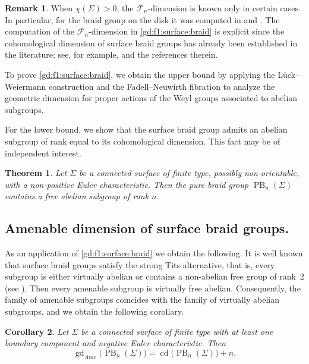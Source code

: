 \documentclass[a4paper,12pt,leqno]{amsart}
\newtheorem{theorem}{Theorem}[section]
\newtheorem{corollary}[theorem]{Corollary}
\theoremstyle{definition}
\newtheorem{remark}{Remark}
\DeclareMathOperator{\cd}{cd}
\newcommand{\ame}{Ame}
\DeclareMathOperator{\gd}{gd}
\DeclareMathOperator{\pb}{PB}
\begin{document}
\begin{remark}
When \(\chi(\Sigma)>0\), the \(\mathcal{F}_n\)-dimension is known only in certain cases. In particular, for the braid group on the disk it was computed in \cite{Ramon:Juan} and \cite[Theorem~1.3]{PL}. The computation of the \(\mathcal{F}_n\)-dimension in \cref{gd:f1:surface:braid} is explicit since the cohomological dimension of surface braid groups has already been established in the literature; see, for example, \cite[Theorem~1.1]{2025arXiv250610706L} and the references therein. %
\end{remark}

To prove \cref{gd:f1:surface:braid}, we obtain the upper bound by applying the Lück--Weiermann construction and the  Fadell--Neuwirth fibration to analyze the geometric dimension for proper actions of the Weyl groups associated to abelian subgroups.

For the lower bound, we show that the surface braid group admits an abelian subgroup of rank equal to its cohomological dimension. This fact may be of independent interest.

\begin{theorem}\label{free:abelian:subgroup:cd:0}
Let \( \Sigma \) be a connected surface of finite type, possibly non-orientable, with a non-positive Euler characteristic. Then the pure braid group $\pb_n(\Sigma)$ contains a free abelian subgroup of rank $n$.
\end{theorem}

\subsection*{Amenable dimension of surface braid groups.} 

As an application of \cref{gd:f1:surface:braid} we obtain the following. 
It is well known that surface braid groups satisfy the strong Tits alternative, 
that is, every subgroup is either virtually abelian or contains a non-abelian free group of rank~2 
(see \cite{MR745513,MR800253,MR726319}). Then every amenable subgroup is virtually free abelian. Consequently, the family of amenable subgroups coincides with the family of virtually abelian subgroups, 
and we obtain the following corollary.

\begin{corollary}
    Let \( \Sigma \) be a connected surface of finite type with at least one boundary component and negative Euler characteristic. Then %
    \[
    \gd_{\ame}\!\big(\pb_n(\Sigma)\big) =\cd\!\big(\pb_n(\Sigma)\big) + n.
    \]
\end{corollary}
\end{document}
